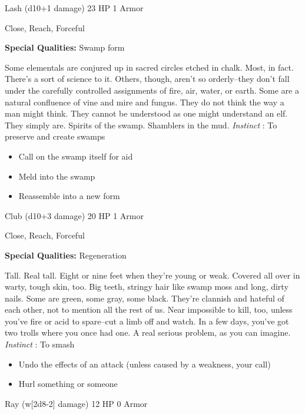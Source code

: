 

 Lash (d10+1 damage) 23 HP 1 Armor


 Close, Reach, Forceful


 \textbf{Special Qualities:}
 Swamp form


 Some elementals are conjured up in sacred circles etched in chalk. Most, in fact. There's a sort of science to it. Others, though, aren't so orderly--they don't fall under the carefully controlled assignments of fire, air, water, or earth. Some are a natural confluence of vine and mire and fungus. They do not think the way a man might think. They cannot be understood as one might understand an elf. They simply are. Spirits of the swamp. Shamblers in the mud. \emph{Instinct}
: To preserve and create swamps
\begin{itemize}
\item Call on the swamp itself for aid
\item Meld into the swamp
\item Reassemble into a new form

\end{itemize}




 Club (d10+3 damage) 20 HP 1 Armor


 Close, Reach, Forceful


 \textbf{Special Qualities:}
 Regeneration


 Tall. Real tall. Eight or nine feet when they're young or weak. Covered all over in warty, tough skin, too. Big teeth, stringy hair like swamp moss and long, dirty nails. Some are green, some gray, some black. They're clannish and hateful of each other, not to mention all the rest of us. Near impossible to kill, too, unless you've fire or acid to spare--cut a limb off and watch. In a few days, you've got two trolls where you once had one. A real serious problem, as you can imagine. \emph{Instinct}
: To smash
\begin{itemize}
\item Undo the effects of an attack (unless caused by a weakness, your call)
\item Hurl something or someone

\end{itemize}




 Ray (w[2d8-2] damage) 12 HP 0 Armor


